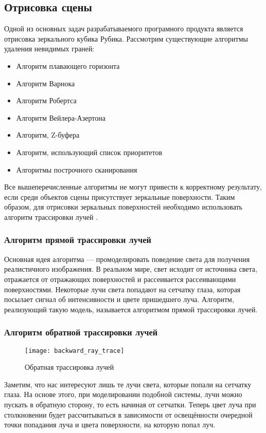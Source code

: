 \subsection{Отрисовка сцены}
Одной из основных задач разрабатываемого програмного продукта является отрисовка зеркального кубика Рубика. Рассмотрим существующие алгоритмы удаления невидимых граней:
\begin{itemize}
	\item Алгоритм плавающего горизонта
	\item Алгоритм Варнока
	\item Алгоритм Робертса
	\item Алгоритм Вейлера-Азертона
	\item Алгоритм, Z-буфера
	\item Алгоритм, использующий список приоритетов
	\item Алгоритмы построчного сканирования
\end{itemize}

Все вышеперечисленные алгоритмы не могут привести к корректному результату, если среди объектов сцены присутствует зеркальные поверхности. Таким образом, для отрисовки зеркальных поверхностей необходимо использовать алгоритм трассировки лучей \cite{bib:computergraphics}.

\subsubsection{Алгоритм прямой трассировки лучей}
Основная идея алгоритма --- промоделировать поведение света для получения реалистичного изображения. В реальном мире, свет исходит от источника света, отражается от отражающих поверхностей и рассеивается рассеивающими поверхностями. Некоторые лучи света попадают на сетчатку глаза, которая посылает сигнал об интенсивности и цвете пришедшего луча. Алгоритм, реализующий такую модель, называется алгоритмом прямой трассировки лучей.

\subsubsection{Алгоритм обратной трассировки лучей}
\begin{figure}[ht]
	\centering
	\texttt{[image: backward\_ray\_trace]}
	\caption{Обратная трассировка лучей}
	\label{fig:backward_ray_trace}
\end{figure}

Заметим, что нас интересуют лишь те лучи света, которые попали на сетчатку глаза. На основе этого, при моделировании подобной системы, лучи можно пускать в обратную сторону, то есть начиная от сетчатки. Теперь цвет луча при столкновении будет рассчитываться в зависимости от освещённости очередной точки попадания луча и цвета поверхности, на которую попал луч.

